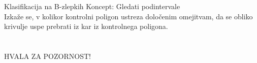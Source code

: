 \documentclass{beamer} %
\begin{document}
\begin{frame}{Klasifikacija na B-zlepkih}
Koncept: Gledati podintervale\\
Izkaže se, v kolikor kontrolni poligon ustreza določenim omejitvam, da se obliko krivulje uspe prebrati iz kar iz kontrolnega poligona. 

\end{frame}

\section{}
\begin{frame}
\begin{center}
HVALA ZA POZORNOST! 
\end{center}
\end{frame}

 
\end{document}
